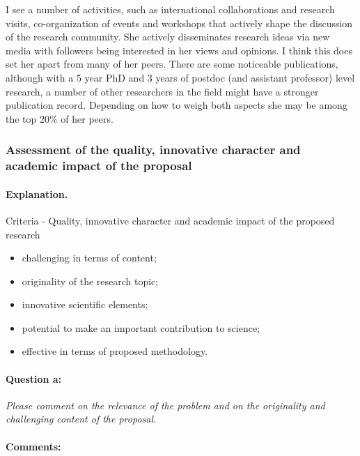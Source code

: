 \documentclass[serif, twocolumn, numeric, rga]{jote-article}
\begin{document}
I see a number of activities, such as international collaborations and research visits, co-organization of events and workshops that actively shape the discussion of the research community. She actively disseminates research ideas via new media with followers being interested in her views and opinions. I think this does set her apart from many of her peers. There are some noticeable publications, although with a 5 year PhD and 3 years of postdoc (and assistant professor) level research, a number of other researchers in the field might have a stronger publication record. Depending on how to weigh both aspects she may be among the top 20\% of her peers.

\subsubsection*{Assessment of the quality, innovative character and academic impact of the proposal}

\paragraph{Explanation.}

Criteria - Quality, innovative character and academic impact of the proposed research 
\begin{itemize}\item challenging in terms of content; \item originality of the research topic; \item innovative scientific elements; \item potential to make an important contribution to science; \item effective in terms of proposed methodology.
\end{itemize}

\paragraph{Question a:}
\textit{Please comment on the relevance of the problem and on the originality and challenging content of the proposal.}

\paragraph{Comments:}
\end{document}
